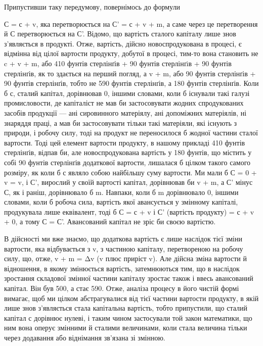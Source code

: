 Припустивши таку передумову, повернімось до формули

С = с + v, яка перетворюється на С' = с + v + m, а саме через це
перетворення й С перетворюється на С'. Відомо, що вартість сталого
капіталу лише знов з’являється в продукті. Отже, вартість,
дійсно новоспродукована в процесі, є відмінна від цілої вартости
продукту, добутої в процесі, тим-то вона становить не
c + v + m, або 410 фунтів стерлінґів + 90 фунтів стерлінґiв + 90 фунтів
стерлінґів, як то здається на перший погляд, а v + m, або
90 фунтів стерлінґів + 90 фунтів стерлінґів, тобто не 590 фунтів
стерлінґів, а 180 фунтів стерлінґів. Коли б с, сталий капітал,
дорівнював 0, іншими словами, коли б існували такі галузі промисловости,
де капіталіст не мав би застосовувати жодних спродукованих
засобів продукції — ані сировинного матеріялу, ані
допоміжних матеріялів, ні знаряддя праці, а мав би застосовувати
тільки такі матеріяли, які існують з природи, і робочу
силу, тоді на продукт не переносилося б жодної частини сталої
вартости. Тоді цей елемент вартости продукту, в нашому прикладі
410 фунтів стерлінґів, відпав би, але новоспродукована вартість
у 180 фунтів, що містить у собі 90 фунтів стерлінґів додаткової
вартости, лишалася б цілком такого самого розміру, як коли б
с являло собою найбільшу суму вартости. Ми мали б С = 0 + v = v,
і С', вирослий у своїй вартості капітал, дорівнював би v + m, а
С' мінус С, як і раніш, дорівнювало б m. Навпаки, коли б m дорівнювало
0, іншими словами, коли б робоча сила, вартість якої
авансується у змінному капіталі, продукувала лише еквівалент,
тоді б С = с + v і С' (вартість продукту) = с + v + 0, а тому С = С'.
Авансований капітал не зріс би своєю вартістю.

В дійсності ми вже знаємо, що додаткова вартість є лише наслідок
тієї зміни вартости, яка відбувається з v, з частиною капіталу,
перетвореною на робочу силу, що, отже, v + m = Δv (v плюс
приріст v). Але дійсна зміна вартости й відношення, в якому
змінюється вартість, затемнюються тим, що в наслідок зростання
складової змінної частини капіталу зростає також і ввесь авансований
капітал. Він був 500, а стає 590. Отже, аналіза процесу в його
чистій формі вимагає, щоб ми цілком абстрагувалися від тієї
частини вартости продукту, в якій лише знов з’являється стала
капітальна вартість, тобто припустили, що сталий капітал с
дорівнює нулеві, і таким чином застосували той закон математики,
що ним вона оперує змінними й сталими величинами, коли
стала величина тільки через додавання або віднімання зв’язана
зі змінною.
